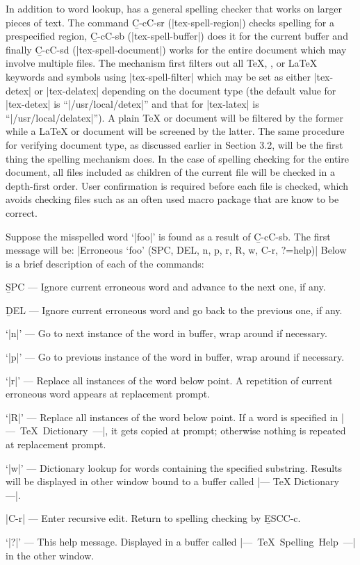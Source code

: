 {\begin{env}
\begin{minipage}
In addition to word lookup, {\TM} has a general spelling checker
that works on larger pieces of text.
The command {\b C-c{\s}C-s{\s}r} (\hbox{|tex-spell-region|}) checks spelling
for a prespecified region,
{\b C-c{\s}C-s{\s}b} (\hbox{|tex-spell-buffer|}) does it for the current buffer
and finally {\b C-c{\s}C-s{\s}d} (\hbox{|tex-spell-document|}) works for
the entire document which may involve multiple files.
The mechanism first filters out all {\TeX}, {\AmSTeX}, or {\LaTeX} keywords
and symbols using \hbox{|tex-spell-filter|} which may be set as
either |tex-detex| or |tex-delatex| depending on the document type
(the default value for |tex-detex| is ``|/usr/local/detex|''
and that for |tex-latex| is ``|/usr/local/delatex|'').
A plain {\TeX} or {\AmSTeX} document will be filtered by the former while
a {\LaTeX} or {\SliTeX} document will be screened by the latter.
The same procedure for verifying document type, as discussed
earlier in Section 3.2, will be the first thing the spelling mechanism does.
In the case of spelling checking for the entire document,
all files included as children of the current file will be checked
in a depth-first order.  User confirmation is required before each
file is checked, which avoids checking files such as an often used macro
package that are know to be correct.

Suppose the misspelled word `|foo|' is found as
a result of {\b C-c{\s}C-s{\s}b}.
The first message will be:
\begindisplay
|Erroneous `foo' (SPC, DEL, n, p, r, R, w, C-r, ?=help)|\cr
\enddisplay
Below is a brief description of each of the commands:
\item{\bull}{{\b SPC} --- Ignore current erroneous word and advance to the
next one, if any.}
\item{\bull}{{\b DEL} --- Ignore current erroneous word and go back to the
previous one, if any.}
\item{\bull}{`|n|' --- Go to next instance of the word in buffer, wrap around
if necessary.} 
\item{\bull}{`|p|' --- Go to previous instance of the word in buffer,
wrap around if necessary.}
\item{\bull}{`|r|' --- Replace all instances of the word below point.
A repetition of current erroneous word appears at replacement prompt.}
\item{\bull}{`|R|' --- Replace all instances of the word below point.
If a word is specified in \hbox{|--- TeX Dictionary ---|}, 
it gets copied at prompt;
otherwise nothing is repeated at replacement prompt.}
\item{\bull}{`|w|' --- Dictionary lookup for words containing the specified
substring.  Results will be displayed in other window bound to a buffer called
|--- TeX Dictionary ---|.}
\item{\bull}{|C-r| --- Enter recursive edit.  Return to spelling checking
by {\b ESC{\s}C-c}.}
\item{\bull}{`|?|' --- This help message. Displayed in a buffer called
\hbox{|--- TeX Spelling Help ---|} in the other window.}


\end{minipage}
\end{env}}
